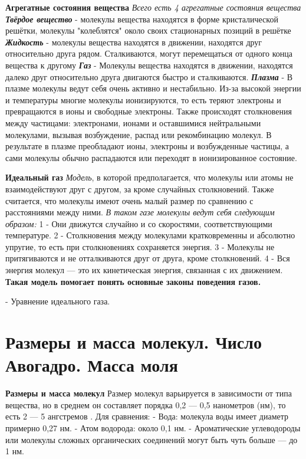 \documentclass[14pt]{article}
\begin{document}
    \textbf{Агрегатные состояния вещества}
    \newline \textit{Всего есть 4 агрегатные состояния вещества}
    \newline \textbf{\textit{Твёрдое вещество}} - молекулы вещества находятся в форме кристалической решётки, молекулы "колеблятся" около своих стационарных позиций в решётке
    \newline \textbf{\textit{Жидкость}} - молекулы вещества находятся в движении, находятся друг относительно друга рядом. Сталкиваются,  могут перемещаться от одного конца вещества к другому
    \newline \textbf{\textit{Газ}} - Молекулы вещества находятся в движении, находятся далеко друг относительно друга двигаются быстро и сталкиваются.
    \newline \textbf{\textit{Плазма}} - В плазме молекулы ведут себя очень активно и нестабильно. Из-за высокой энергии и температуры многие молекулы ионизируются, то есть теряют электроны и превращаются в ионы и свободные электроны. Также происходят столкновения между частицами: электронами, ионами и оставшимися нейтральными молекулами, вызывая возбуждение, распад или рекомбинацию молекул. В результате в плазме преобладают ионы, электроны и возбужденные частицы, а сами молекулы обычно распадаются или переходят в ионизированное состояние.

    \textbf{Идеальный газ}
    \newline \textit{Модель}, в которой предполагается, что молекулы или атомы не взаимодействуют друг с другом, за кроме случайных столкновений. Также считается, что молекулы имеют очень малый размер по сравнению с расстояниями между ними. 
    \newline \textit{В таком газе молекулы ведут себя следующим образом:}  
    1 - Они движутся случайно и со скоростями, соответствующими температуре. 
    2 - Столкновения между молекулами кратковременны и абсолютно упругие, то есть при столкновениях сохраняется энергия. 
    3 - Молекулы не притягиваются и не отталкиваются друг от друга, кроме столкновений.
    4 - Вся энергия молекул — это их кинетическая энергия, связанная с их движением.
    \textbf{ Такая модель помогает понять основные законы поведения газов.}
    \begin{center}
        \big[$PV=\nu RT$\big] - Уравнение идеального газа.
    \end{center} 

    \section{Размеры и масса молекул. Число Авогадро. Масса моля}
    \textbf{Размеры и масса молекул}
    Размер молекул варьируется в зависимости от типа вещества, но в среднем он составляет порядка 0,2 — 0,5 нанометров (нм), то есть 2 — 5 ангстремов . 
    \newline Для сравнения: - Вода: молекула воды имеет диаметр примерно 0,27 нм. - Атом водорода: около 0,1 нм. - Ароматические углеводороды или молекулы сложных органических соединений могут быть чуть больше — до 1 нм.
    
\end{document}
